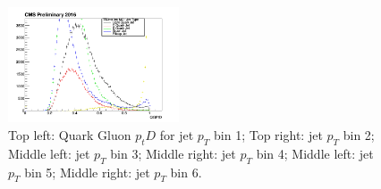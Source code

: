 \begin{figure}[htbp]
\begin{center}
  \includegraphics[width=0.45\textwidth]{sections/mc4/TopTagger/figures/_b_qgptdjetptbin5_.png}
 \end{center}
 \caption{Top left: Quark Gluon $p_{t}D$ for jet $p_{T}$ bin 1; Top right: jet $p_{T}$ bin 2; Middle left: jet $p_{T}$ bin 3; Middle right: jet $p_{T}$ bin 4; Middle left: jet $p_{T}$ bin 5; Middle right: jet $p_{T}$ bin 6.}
 \label{fig:c4ttqgptdjetpt}
\end{figure}

